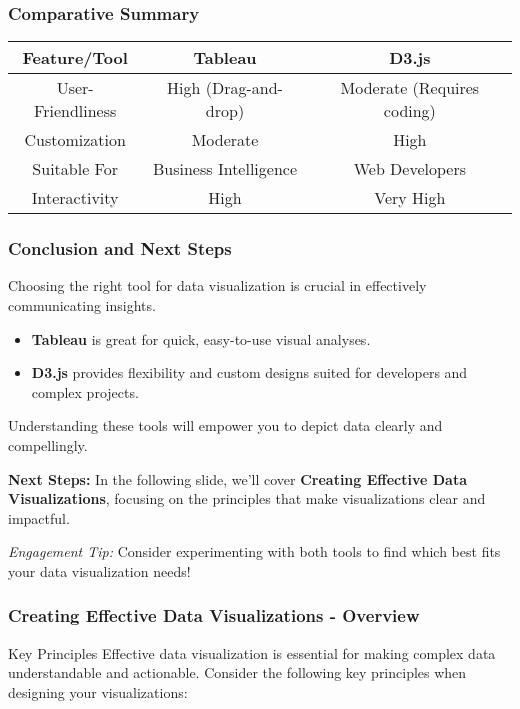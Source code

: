 \documentclass{beamer}
\begin{document}
\begin{frame}[fragile]
    \frametitle{Comparative Summary}
    \begin{table}[ht]
    \centering
    \begin{tabular}{|c|c|c|}
        \hline
        \textbf{Feature/Tool} & \textbf{Tableau} & \textbf{D3.js} \\
        \hline
        User-Friendliness & High (Drag-and-drop) & Moderate (Requires coding) \\
        \hline
        Customization & Moderate & High \\
        \hline
        Suitable For & Business Intelligence & Web Developers \\
        \hline
        Interactivity & High & Very High \\
        \hline
    \end{tabular}
    \end{table}
\end{frame}

\begin{frame}[fragile]
    \frametitle{Conclusion and Next Steps}
    Choosing the right tool for data visualization is crucial in effectively communicating insights.
    
    \begin{itemize}
        \item \textbf{Tableau} is great for quick, easy-to-use visual analyses.
        \item \textbf{D3.js} provides flexibility and custom designs suited for developers and complex projects.
    \end{itemize}
    
    Understanding these tools will empower you to depict data clearly and compellingly.
    
    \textbf{Next Steps:} In the following slide, we'll cover \textbf{Creating Effective Data Visualizations}, focusing on the principles that make visualizations clear and impactful.
    
    \textit{Engagement Tip:} Consider experimenting with both tools to find which best fits your data visualization needs!
\end{frame}

\begin{frame}[fragile]
    \frametitle{Creating Effective Data Visualizations - Overview}
    \begin{block}{Key Principles}
        Effective data visualization is essential for making complex data understandable and actionable. Consider the following key principles when designing your visualizations:
    \end{block}
\end{frame}
\end{document}
